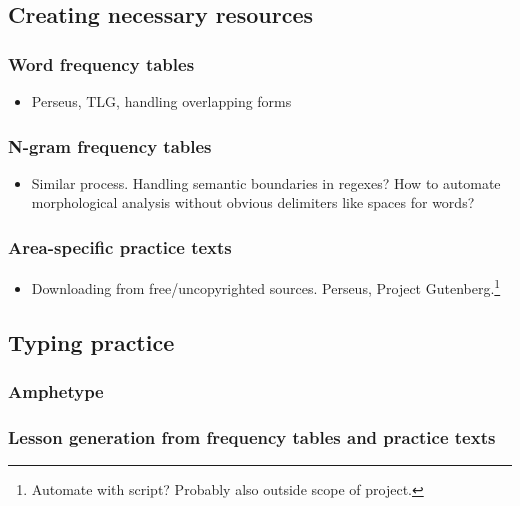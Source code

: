 \documentclass[11pt]{article}
\begin{document}
\subsection{Creating necessary resources}
\label{sec:org7626177}

\subsubsection{Word frequency tables}
\label{sec:orgb684da5}

\begin{itemize}
\item Perseus, TLG, handling overlapping forms
\end{itemize}

\subsubsection{N-gram frequency tables}
\label{sec:org1454d68}

\begin{itemize}
\item Similar process. Handling semantic boundaries in regexes? How to automate morphological analysis without obvious delimiters like spaces for words?
\end{itemize}

\subsubsection{Area-specific practice texts}
\label{sec:org78ecc97}

\begin{itemize}
\item Downloading from free/uncopyrighted sources. Perseus, Project Gutenberg.\footnote{Automate with script? Probably also outside scope of project.}
\end{itemize}

\subsection{Typing practice}
\label{sec:orge3476e4}

\subsubsection{Amphetype}
\label{sec:orgdd065fc}

\subsubsection{Lesson generation from frequency tables and practice texts}
\label{sec:orgcd012ac}
\end{document}
